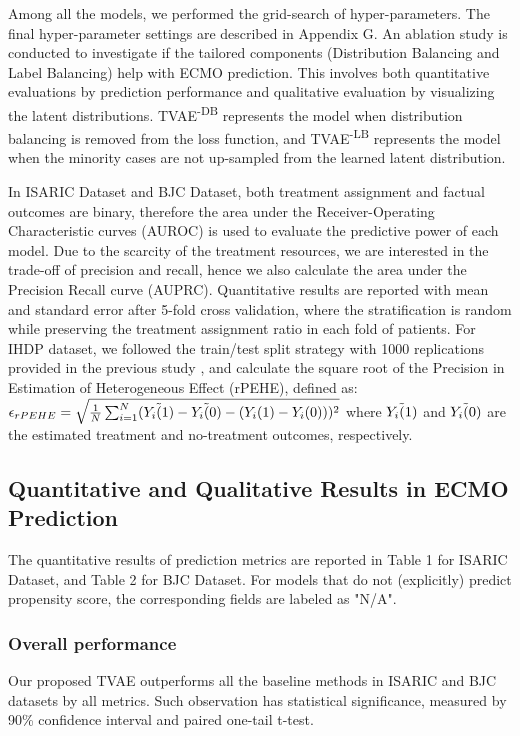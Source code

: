 Among all the models, we performed the grid-search of hyper-parameters. The final hyper-parameter settings are described in Appendix G. 
An ablation study is conducted to  investigate if the tailored components (Distribution Balancing and Label Balancing) help with ECMO prediction. This involves both quantitative evaluations by prediction performance and qualitative evaluation by visualizing the latent distributions. TVAE\textsuperscript{-DB} represents the model when distribution balancing is removed from the loss function, and TVAE\textsuperscript{-LB} represents the model when the minority cases are not up-sampled from the learned latent distribution. 

In ISARIC Dataset and BJC Dataset, both treatment assignment and factual outcomes are binary, therefore the area under the Receiver-Operating Characteristic curves (AUROC) is used to evaluate the predictive power of each model. Due to the scarcity of the treatment resources, we are interested in the trade-off of precision and recall, hence we also calculate the area under the Precision Recall curve (AUPRC). Quantitative results are reported with mean and standard error after 5-fold cross validation, where the stratification is random while preserving the treatment assignment ratio in each fold of patients.
For IHDP dataset, we followed the train/test split strategy with 1000 replications provided in the previous study \cite{louizos2017cevae}, and calculate the square root of the Precision in Estimation of Heterogeneous Effect (rPEHE), defined as:
$
    \epsilon_{rPEHE} = \sqrt{\frac{1}{N}\sum_{i=1}^{N} (\Tilde{Y_i(1)}-\Tilde{Y_i(0)} - (Y_i(1) -Y_i(0) ) )^2} 
$
where $\Tilde{Y_i(1)}$ and $\Tilde{Y_i(0)}$ are the estimated treatment and no-treatment outcomes, respectively. 


\subsection{Quantitative and Qualitative Results in ECMO Prediction}
The quantitative results of prediction metrics are reported in Table 1 for ISARIC Dataset, and Table 2 for BJC Dataset. For models that do not (explicitly) predict propensity score, the corresponding fields are labeled as "N/A".
\subsubsection{Overall performance}
Our proposed TVAE outperforms all the baseline methods in ISARIC and BJC datasets by all metrics. Such observation has statistical significance, measured by 90\% confidence interval and paired one-tail t-test. 
